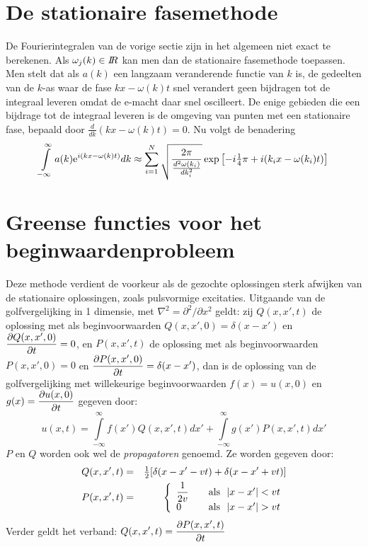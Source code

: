 \documentclass[twoside]{report}
\begin{document}
\section{De stationaire fasemethode}
De Fourierintegralen van de vorige sectie zijn in het algemeen niet exact te
berekenen. Als $\omega_j(k)\in I\hspace{-1mm}R$ kan men dan de stationaire fasemethode
toepassen. Men stelt dat als $a(k)$ een langzaam veranderende functie van $k$
is, de gedeelten van de $k$-as waar de fase $kx-\omega(k)t$ snel verandert
geen bijdragen tot de integraal leveren omdat de e-macht daar snel oscilleert.
De enige gebieden die een bijdrage tot de integraal leveren is de omgeving
van punten met een stationaire fase, bepaald door
$\displaystyle\frac{d}{dk}(kx-\omega(k)t)=0$. Nu volgt de benadering
\[
\int\limits_{-\infty}^\infty a(k){\rm e}^{i(kx-\omega(k)t)}dk\approx
\sum_{i=1}^{N}\sqrt{\frac{2\pi}{\frac{d^2\omega(k_i)}{dk_i^2}}}
\exp\left[-i\mbox{$\frac{1}{4}$}\pi+i(k_ix-\omega(k_i)t)\right]
\]

\section{Greense functies voor het beginwaardenprobleem}
Deze methode verdient de voorkeur als de gezochte oplossingen sterk afwijken
van de stationaire oplossingen, zoals pulsvormige excitaties. Uitgaande van
de golfvergelijking in 1 dimensie, met $\nabla^2=\partial^2/\partial x^2$ geldt:
zij $Q(x,x',t)$ de oplossing met als beginvoorwaarden $Q(x,x',0)=\delta(x-x')$
en $\displaystyle\frac{\partial Q(x,x',0)}{\partial t}=0$, en $P(x,x',t)$ de oplossing met als
beginvoorwaarden $P(x,x',0)=0$ en $\displaystyle\frac{\partial P(x,x',0)}{\partial t}=\delta(x-x')$,
dan is de oplossing van de golfvergelijking met willekeurige beginvoorwaarden
$f(x)=u(x,0)$ en $\displaystyle g(x)=\frac{\partial u(x,0)}{\partial t}$ gegeven door:
\[
u(x,t)=\int\limits_{-\infty}^\infty f(x')Q(x,x',t)dx'+
\int\limits_{-\infty}^\infty g(x')P(x,x',t)dx'
\]
$P$ en $Q$ worden ook wel de {\it propagatoren} genoemd. Ze worden gegeven
door:
\begin{eqnarray*}
Q(x,x',t)&=&\half[\delta(x-x'-vt)+\delta(x-x'+vt)]\\
P(x,x',t)&=&
\left\{\begin{array}{ll}
\displaystyle\frac{1}{2v}&~~~\mbox{als}~~|x-x'|<vt\\
0&~~~\mbox{als}~~|x-x'|>vt
\end{array}\right.
\end{eqnarray*}
Verder geldt het verband: $\displaystyle Q(x,x',t)=\frac{\partial P(x,x',t)}{\partial t}$
\end{document}
